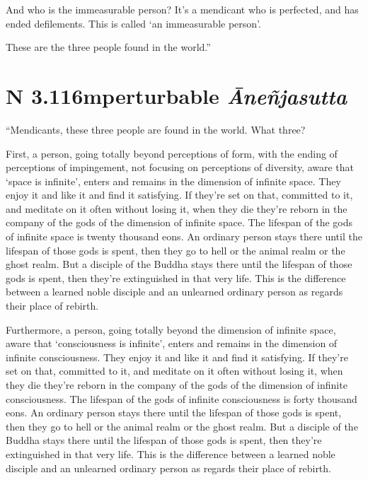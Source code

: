 \documentclass[12pt,openany]{book}%
\newcommand*{\suttatitleacronym}[1]{\smaller[2]{#1}\vspace*{.3em}}
\newcommand*{\suttatitletranslation}[1]{\linebreak{#1}}
\newcommand*{\suttatitleroot}[1]{\linebreak\smaller[2]\itshape{#1}}
\newcommand*{\tocacronym}[1]{\hspace*{-3.3em}{#1}\quad}
\newcommand*{\toctranslation}[1]{#1}
\newcommand*{\tocroot}[1]{(\textit{#1})}
\begin{document}
And who is the immeasurable person? It’s a mendicant who is perfected, and has ended defilements. This is called ‘an immeasurable person’. 

These are the three people found in the world.” 

%
\section*{{\suttatitleacronym AN 3.116}{\suttatitletranslation Imperturbable }{\suttatitleroot Āneñjasutta}}
\addcontentsline{toc}{section}{\tocacronym{AN 3.116} \toctranslation{Imperturbable } \tocroot{Āneñjasutta}}

“Mendicants, these three people are found in the world. What three? 

First, a person, going totally beyond perceptions of form, with the ending of perceptions of impingement, not focusing on perceptions of diversity, aware that ‘space is infinite’, enters and remains in the dimension of infinite space. They enjoy it and like it and find it satisfying. If they’re set on that, committed to it, and meditate on it often without losing it, when they die they’re reborn in the company of the gods of the dimension of infinite space. The lifespan of the gods of infinite space is twenty thousand eons. An ordinary person stays there until the lifespan of those gods is spent, then they go to hell or the animal realm or the ghost realm. But a disciple of the Buddha stays there until the lifespan of those gods is spent, then they’re extinguished in that very life. This is the difference between a learned noble disciple and an unlearned ordinary person as regards their place of rebirth. 

Furthermore, a person, going totally beyond the dimension of infinite space, aware that ‘consciousness is infinite’, enters and remains in the dimension of infinite consciousness. They enjoy it and like it and find it satisfying. If they’re set on that, committed to it, and meditate on it often without losing it, when they die they’re reborn in the company of the gods of the dimension of infinite consciousness. The lifespan of the gods of infinite consciousness is forty thousand eons. An ordinary person stays there until the lifespan of those gods is spent, then they go to hell or the animal realm or the ghost realm. But a disciple of the Buddha stays there until the lifespan of those gods is spent, then they’re extinguished in that very life. This is the difference between a learned noble disciple and an unlearned ordinary person as regards their place of rebirth. 
\end{document}
